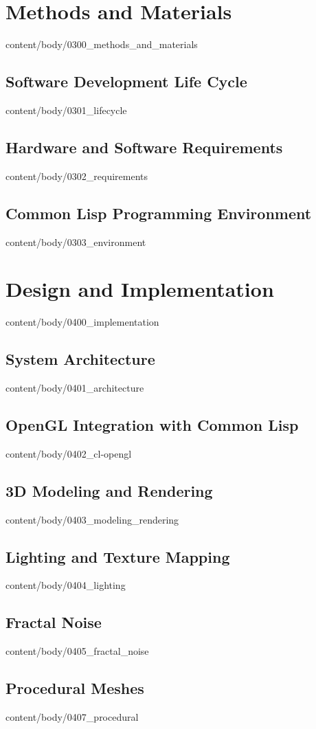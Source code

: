\documentclass[english, tfg, loc, lof, covers, printable, firstnumbered, epsbased]{tfgtfmthesisuam}
\begin{document}
\chapter{Methods and Materials}{content/body/0300_methods_and_materials}            %
  \section{Software Development Life Cycle}{content/body/0301_lifecycle}            %
  \section{Hardware and Software Requirements}{content/body/0302_requirements}      %
  \section{Common Lisp Programming Environment}{content/body/0303_environment}      %

\chapter{Design and Implementation}{content/body/0400_implementation}               %
  \section{System Architecture}{content/body/0401_architecture}                     %
  \section{OpenGL Integration with Common Lisp}{content/body/0402_cl-opengl}        %
  \section{3D Modeling and Rendering}{content/body/0403_modeling_rendering}         %
  \section{Lighting and Texture Mapping}{content/body/0404_lighting}                %
  \section{Fractal Noise}{content/body/0405_fractal_noise}                          %
  \section{Procedural Meshes}{content/body/0407_procedural}                         %
\end{document}
